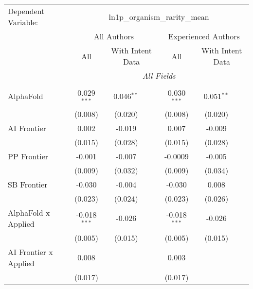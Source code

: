 \begingroup
\centering
\begin{tabular}{lcccccc}
   \tabularnewline \midrule \midrule
   Dependent Variable: & \multicolumn{6}{c}{ln1p\_organism\_rarity\_mean}\\
 & \multicolumn{3}{c}{All Authors} & \multicolumn{3}{c}{Experienced Authors} \\
\cmidrule(lr){2-4} \cmidrule(lr){5-7}
 & \multicolumn{1}{c}{All} & \multicolumn{2}{c}{With Intent Data} & \multicolumn{1}{c}{All} & \multicolumn{2}{c}{With Intent Data} \\
\cmidrule(lr){2-2} \cmidrule(lr){3-4} \cmidrule(lr){5-5} \cmidrule(lr){6-7}
 & \multicolumn{6}{c}{\textit{All Fields}} \\ \\
   AlphaFold                      & 0.029$^{***}$  & 0.046$^{**}$ &             & 0.030$^{***}$  & 0.051$^{**}$ &   \\   
                                  & (0.008)        & (0.020)      &             & (0.008)        & (0.020)      &   \\   
   AI Frontier                    & 0.002          & -0.019       &             & 0.007          & -0.009       &   \\   
                                  & (0.015)        & (0.028)      &             & (0.015)        & (0.028)      &   \\   
   PP Frontier                    & -0.001         & -0.007       &             & -0.0009        & -0.005       &   \\   
                                  & (0.009)        & (0.032)      &             & (0.009)        & (0.034)      &   \\   
   SB Frontier                    & -0.030         & -0.004       &             & -0.030         & 0.008        &   \\   
                                  & (0.023)        & (0.024)      &             & (0.023)        & (0.026)      &   \\   
   AlphaFold x Applied            & -0.018$^{***}$ & -0.026       &             & -0.018$^{***}$ & -0.026       &   \\   
                                  & (0.005)        & (0.015)      &             & (0.005)        & (0.015)      &   \\   
   AI Frontier x Applied          & 0.008          &              &             & 0.003          &              &   \\   
                                  & (0.017)        &              &             & (0.017)        &              &   \\   

\end{tabular}
